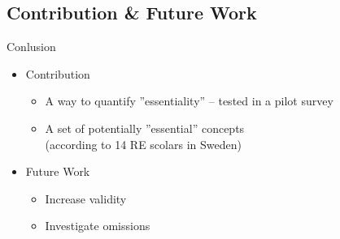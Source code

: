 \documentclass{slides}
\begin{document}
\subsection{Contribution \& Future Work}
\begin{Slide}{Conlusion}

\begin{itemize} 
\item Contribution
\begin{itemize} 
\item A way to quantify ''essentiality'' -- tested in a pilot survey
\item A set of potentially ''essential'' concepts \\ (according to 14 RE scolars in Sweden)
\end{itemize}
\end{itemize}

\begin{itemize} 
\item Future Work
\begin{itemize} 
\item Increase validity
\item Investigate omissions
\end{itemize}
\end{itemize}
\end{Slide}
\end{document}
